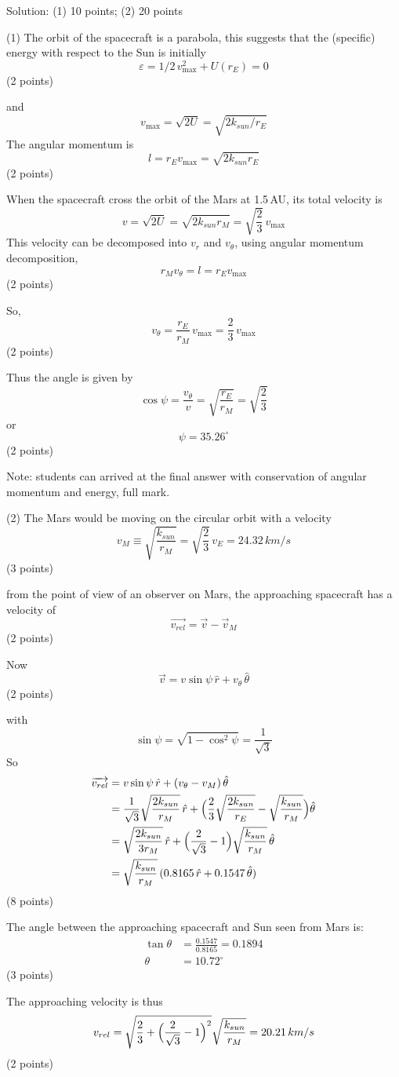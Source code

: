 Solution: (1) 10 points; (2) 20 points

(1) The orbit of the spacecraft is a parabola, this suggests that the
(specific) energy with respect to the Sun is initially
\[
  \varepsilon = 1/2\,v_{\max}^2 + U(r_E) = 0
\]
\hfill(2 points)

and
\[
  v_{\max} = \sqrt{2U} = \sqrt{2k_{sun}/r_E}
\]
The angular momentum is
\[
  l = r_E v_{\max} = \sqrt{2k_{sun}r_E}
\]
\hfill(2 points)

When the spacecraft cross the orbit of the Mars at 1.5\,AU, its total velocity
is
\[
  v = \sqrt{2U} = \sqrt{2k_{sun}r_M} = \sqrt{\frac{2}{3}}\,v_{\max}
\]
This velocity can be decomposed into $v_r$ and $v_\theta$, using angular
momentum decomposition,
\[
  r_M v_\theta = l = r_E v_{\max}
\]
\hfill(2 points)

So,
\[
  v_\theta = \frac{r_E}{r_M}\,v_{\max} = \frac{2}{3}\,v_{\max}
\]
\hfill(2 points)

Thus the angle is given by
\[
  \cos\psi = \frac{v_\theta}{v} = \sqrt{\frac{r_E}{r_M}} = \sqrt{\frac{2}{3}}
\]
or
\[
  \psi = 35.26^\circ
\]
\hfill(2 points)

Note: students can arrived at the final answer with conservation of angular
momentum and energy, full mark.

(2) The Mars would be moving on the circular orbit with a velocity
\[
  v_M \equiv \sqrt{\frac{k_{sun}}{r_M}} = \sqrt{\frac{2}{3}}\,v_E
  = 24.32\,km/s
\]
\hfill(3 points)

from the point of view of an observer on Mars, the approaching spacecraft has
a velocity of
\[
  \overrightarrow{v_{rel}} = \vec{v} - \vec{v}_M
\]
\hfill(2 points)

Now
\[
  \vec{v} = v\sin\psi\,\hat{r} + v_\theta\,\hat{\theta}
\]
\hfill(2 points)

with
\[
  \sin\psi = \sqrt{1 - \cos^2\psi} = \frac{1}{\sqrt{3}}
\]
So
\begin{align*}
  \overrightarrow{v_{rel}}
  &= v\sin\psi\,\hat{r} + (v_\theta - v_M)\,\hat{\theta} \\
  &= \frac{1}{\sqrt{3}}\sqrt{\frac{2k_{sun}}{r_M}}\,\hat{r}
   + \Bigl(\frac{2}{3}\sqrt{\frac{2k_{sun}}{r_E}}
   - \sqrt{\frac{k_{sun}}{r_M}}\Bigr)\hat{\theta} \\
  &= \sqrt{\frac{2k_{sun}}{3r_M}}\,\hat{r}
   + \Bigl(\frac{2}{\sqrt{3}} - 1\Bigr)\sqrt{\frac{k_{sun}}{r_M}}\,\hat{\theta} \\
  &= \sqrt{\frac{k_{sun}}{r_M}}\,(0.8165\,\hat{r} + 0.1547\,\hat{\theta})
\end{align*}
\hfill(8 points)

The angle between the approaching spacecraft and Sun seen from Mars is:
\begin{align*}
  \tan\theta &= \frac{0.1547}{0.8165} = 0.1894 \\
  \theta &= 10.72^\circ
\end{align*}
\hfill(3 points)

The approaching velocity is thus
\[
  v_{rel} = \sqrt{\frac{2}{3} + \Bigl(\frac{2}{\sqrt{3}} - 1\Bigr)^2}
            \sqrt{\frac{k_{sun}}{r_M}} = 20.21\,km/s
\]
\hfill(2 points)
